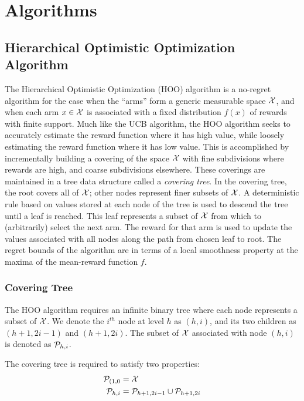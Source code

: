 \section{Algorithms}

\subsection{Hierarchical Optimistic Optimization Algorithm}

The Hierarchical Optimistic Optimization (HOO) algorithm is a
no-regret algorithm for the case when the ``arms'' form a generic
measurable space ${\mathcal{X}}$, and when each arm $x \in {\mathcal{X}}$ is associated
with a fixed distribution $f(x)$ of rewards with finite support. Much
like the UCB algorithm, the HOO algorithm seeks to accurately estimate
the reward function where it has high value, while loosely estimating
the reward function where it has low value. This is accomplished by
incrementally building a covering of the space ${\mathcal{X}}$ with fine
subdivisions where rewards are high, and coarse subdivisions
elsewhere. These coverings are maintained in a tree data structure
called a \emph{covering tree}. In the covering tree, the root covers
all of ${\mathcal{X}}$; other nodes represent finer subsets of ${\mathcal{X}}$. A
deterministic rule based on values stored at each node of the tree is
used to descend the tree until a leaf is reached. This leaf represents
a subset of ${\mathcal{X}}$ from which to (arbitrarily) select the next arm. The
reward for that arm is used to update the values associated with all
nodes along the path from chosen leaf to root. The regret bounds of
the algorithm are in terms of a local smoothness property at the
maxima of the mean-reward function $f$.

\subsubsection{Covering Tree}\label{sss:coverTree}
The HOO algorithm requires an infinite binary tree where each node
represents a subset of ${\mathcal{X}}$. We denote the $i^{th}$ node at level
$h$ as $(h,i)$, and its two children as $(h+1, 2i-1)$ and $(h+1,
2i)$. The subset of ${\mathcal{X}}$ associated with node $(h,i)$ is denoted
as ${\mathcal{P}}_{h,i}$.

The covering tree is required to satisfy two properties:
\begin{align*}
  {\mathcal{P}}_{(1,0} &= {\mathcal{X}}\\
  {\mathcal{P}}_{h,i} &= {\mathcal{P}}_{h+1,2i-1} \cup {\mathcal{P}}_{h+1,2i}
\end{align*}

